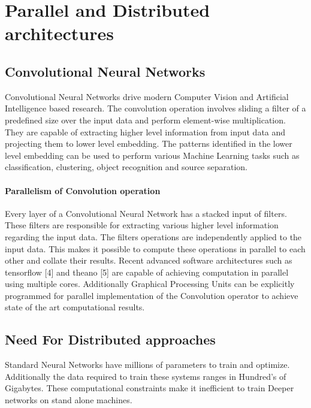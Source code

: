 \documentclass[sigconf]{acmart}
\begin{document}
\section{Parallel and Distributed architectures}

\subsection{Convolutional Neural Networks}

Convolutional Neural Networks drive modern Computer Vision and Artificial Intelligence based research. The convolution operation involves sliding a filter of a predefined size over the input data and perform element-wise multiplication. They are capable of extracting higher level information from input data and projecting them to lower level embedding. The patterns identified in the lower level embedding can be used to perform various Machine Learning tasks such as classification, clustering, object recognition and source separation.


\paragraph{\textbf{Parallelism of Convolution operation}}

Every layer of a Convolutional Neural Network has a stacked input of filters. These filters are responsible for extracting various higher level information regarding the input data. The filters operations are independently applied to the input data. This makes it possible to compute these operations in parallel to each other and collate their results. Recent advanced software architectures such as tensorflow [4] and theano [5] are capable of achieving computation in parallel using multiple cores. Additionally Graphical Processing Units can be explicitly programmed for parallel implementation of the Convolution operator to achieve state of the art computational results.

\subsection{Need For Distributed approaches}

Standard Neural Networks have millions of parameters to train and optimize. Additionally the data required to train these systems ranges in Hundred's of Gigabytes. These computational constraints make it inefficient to train Deeper networks on stand alone machines. 
\end{document}

